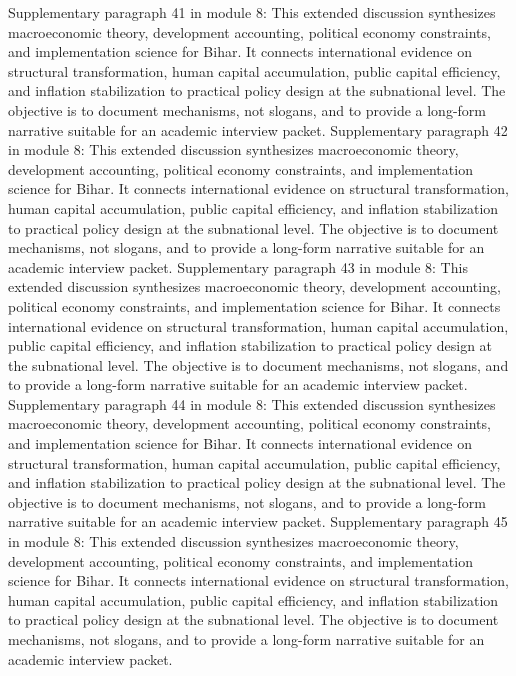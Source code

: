 \documentclass[preprint,12pt]{elsarticle}
\begin{document}
Supplementary paragraph 41 in module 8: This extended discussion synthesizes macroeconomic theory, development accounting, political economy constraints, and implementation science for Bihar. It connects international evidence on structural transformation, human capital accumulation, public capital efficiency, and inflation stabilization to practical policy design at the subnational level. The objective is to document mechanisms, not slogans, and to provide a long-form narrative suitable for an academic interview packet.
Supplementary paragraph 42 in module 8: This extended discussion synthesizes macroeconomic theory, development accounting, political economy constraints, and implementation science for Bihar. It connects international evidence on structural transformation, human capital accumulation, public capital efficiency, and inflation stabilization to practical policy design at the subnational level. The objective is to document mechanisms, not slogans, and to provide a long-form narrative suitable for an academic interview packet.
Supplementary paragraph 43 in module 8: This extended discussion synthesizes macroeconomic theory, development accounting, political economy constraints, and implementation science for Bihar. It connects international evidence on structural transformation, human capital accumulation, public capital efficiency, and inflation stabilization to practical policy design at the subnational level. The objective is to document mechanisms, not slogans, and to provide a long-form narrative suitable for an academic interview packet.
Supplementary paragraph 44 in module 8: This extended discussion synthesizes macroeconomic theory, development accounting, political economy constraints, and implementation science for Bihar. It connects international evidence on structural transformation, human capital accumulation, public capital efficiency, and inflation stabilization to practical policy design at the subnational level. The objective is to document mechanisms, not slogans, and to provide a long-form narrative suitable for an academic interview packet.
Supplementary paragraph 45 in module 8: This extended discussion synthesizes macroeconomic theory, development accounting, political economy constraints, and implementation science for Bihar. It connects international evidence on structural transformation, human capital accumulation, public capital efficiency, and inflation stabilization to practical policy design at the subnational level. The objective is to document mechanisms, not slogans, and to provide a long-form narrative suitable for an academic interview packet.
\end{document}
